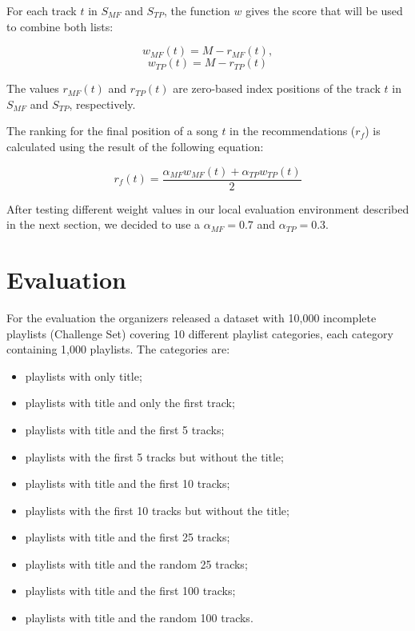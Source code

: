 For each track $t$ in $S_{MF}$ and $S_{TP}$, the function $w$ gives the score that will be used to combine both lists:

\begin{displaymath}
  w_{MF}(t)=M - r_{MF}(t),
\end{displaymath}
\begin{displaymath}
  w_{TP}(t)=M - r_{TP}(t)
\end{displaymath}

The values $r_{MF}(t)$ and $r_{TP}(t)$ are zero-based index positions  of the track $t$ in $S_{MF}$ and $S_{TP}$, respectively.

The ranking for the final position of a song $t$ in the recommendations ($r_{f}$) is calculated using the result of the following equation: 


\begin{displaymath}
  r_{f}(t)=\frac{\alpha_{MF} w_{MF}(t) +\alpha_{TP} w_{TP}(t)}{2} 
\end{displaymath}


After testing different weight values in our local evaluation environment described in the next section, we decided to use a $\alpha_{MF}=0.7$ and $\alpha_{TP}=0.3$.

\section{Evaluation}

For the evaluation the organizers released a dataset with 10,000 incomplete playlists (Challenge Set) covering 10 different playlist categories, each category containing 1,000 playlists. The categories are:
\begin{itemize}
\item playlists with only title;
\item playlists with title and only the first track;
\item playlists with title and the first 5 tracks;
\item playlists with the first 5 tracks but without the title;
\item playlists with title and the first 10 tracks;
\item playlists with the first 10 tracks but without the title;
\item playlists with title and the first 25 tracks;
\item playlists with title and the random 25 tracks;
\item playlists with title and the first 100 tracks;
\item playlists with title and the random 100 tracks.
\end{itemize}

